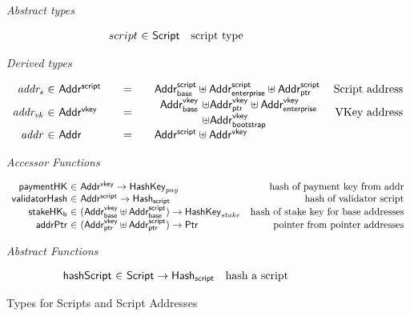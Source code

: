 \documentclass[11pt,a4paper,dvipsnames]{article}
\newcommand{\Addr}{\type{Addr}}
\newcommand{\AddrVKey}{\type{Addr^{vkey}}}
\newcommand{\AddrVKeyB}{\type{Addr^{vkey}_{base}}}
\newcommand{\AddrVKeyP}{\type{Addr^{vkey}_{ptr}}}
\newcommand{\AddrVKeyE}{\type{Addr^{vkey}_{enterprise}}}
\newcommand{\AddrVKeyBS}{\type{Addr^{vkey}_{bootstrap}}}
\newcommand{\AddrScr}{\type{Addr^{script}}}
\newcommand{\AddrScrBase}{\type{Addr_{base}^{script}}}
\newcommand{\AddrScrEnterprise}{\type{Addr_{enterprise}^{script}}}
\newcommand{\AddrScrPtr}{\type{Addr_{ptr}^{script}}}
\newcommand{\HashScr}{\type{Hash_{script}}}
\newcommand{\Ptr}{\type{Ptr}}
\newcommand{\Script}{\type{Script}}
\newcommand{\HashKey}{\type{HashKey}}
\theoremstyle{definition}
\begin{document}
\begin{figure*}[hbt]
  \emph{Abstract types}

  \begin{equation*}
    \begin{array}{r@{~\in~}lr}
      script & \Script & \text{script type}
    \end{array}
  \end{equation*}

  \emph{Derived types}

  \begin{equation*}
    \begin{array}{r@{~\in~}l@{\qquad=\qquad}lr}
      \var{addr_{s}} & \AddrScr & \AddrScrBase \uniondistinct \AddrScrEnterprise
                              \uniondistinct \AddrScrPtr & \text{Script address} \\
      \var{addr_{vk}} & \AddrVKey & \begin{array}{l@{~\uniondistinct}l}
                             \AddrVKeyB & \AddrVKeyP \uniondistinct \AddrVKeyE \\
                                    & \AddrVKeyBS
                           \end{array}
                                & \text{VKey address}\\
      \var{addr} & \Addr & \AddrScr \uniondistinct \AddrVKey
    \end{array}
  \end{equation*}

  \emph{Accessor Functions}

  \begin{equation*}
    \begin{array}{r@{~\in~}lr}
      \fun{paymentHK} & \AddrVKey \to \HashKey_{pay}
      & \text{hash of payment key from addr}\\
      \fun{validatorHash} & \AddrScr \to \HashScr & \text{hash of validator
                                                     script} \\
      \fun{stakeHK_{b}} & (\AddrVKeyB \uniondistinct \AddrScrBase) \to
                          \HashKey_{stake} & \text{hash of stake key for base
                                             addresses}\\
      \fun{addrPtr} & (\AddrVKeyP \uniondistinct \AddrScrPtr) \to \Ptr &
                                                                     \text{pointer
                                                                     from
                                                                     pointer addresses}
    \end{array}
  \end{equation*}

  \emph{Abstract Functions}

  \begin{equation*}
    \begin{array}{r@{~\in~}lr}
      \fun{hashScript} & \Script \to \HashScr & \text{hash a script}
    \end{array}
  \end{equation*}

  \caption{Types for Scripts and Script Addresses}
  \label{fig:types-scripts}
\end{figure*}
\end{document}
